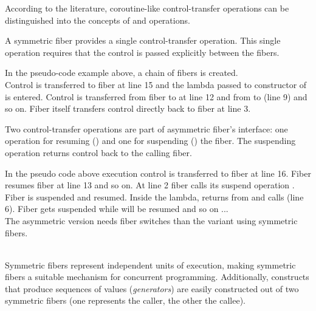 
According to the literature\cite{Moura2009}, coroutine-like control-transfer
operations can be distinguished into the concepts of \sym and \asym
operations.

 A symmetric fiber provides a single
control-transfer operation. This single operation requires that the control is
passed explicitly between the fibers.\\


In the pseudo-code example above, a chain of fibers is created.\\
Control is transferred to fiber  at line 15 and the lambda
passed to constructor of  is entered. Control is transferred from
fiber  to  at line 12 and from  to  (line 9) and
so on. Fiber  itself transfers control directly back to
fiber  at line 3.

 Two control-transfer operations are part of
asymmetric fiber's interface: one operation for resuming (\resume) and one for
suspending () the fiber. The suspending operation returns
control back to the calling fiber.\\

In the pseudo code above execution control is transferred to fiber  at
line 16. Fiber  resumes fiber  at line 13 and so on. At line 2
fiber  calls its suspend operation . Fiber 
is suspended and  resumed. Inside the lambda,  returns from
 and calls  (line 6). Fiber  gets
suspended while  will be resumed and so on ...\\
The asymmetric version needs  fiber switches than the variant
using symmetric fibers.\\

\\
\newline

Symmetric fibers represent independent units of execution, making symmetric
fibers a suitable mechanism for concurrent programming. Additionally,
constructs that produce sequences of values (\emph{generators}) are easily
constructed out of two symmetric fibers (one represents the caller, the other
the callee).\\

